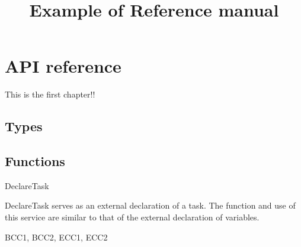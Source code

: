 \documentclass[12pt,a4paper,titlepage]{scrreprt}
\title{Example of Reference manual}
\begin{document}
\maketitle

\thispagestyle{plain}

\tableofcontents

\chapter{API reference}
\label{sec:api_reference}

This is the first chapter!! 

\section{Types}
\label{sec:types}

\section{Functions}
\label{sec:functions}


\begin{function}{DeclareTask}


  \begin{fundescription}
DeclareTask serves as an external declaration of a task. The function
and use of this service are similar to that of the external
declaration of variables.
  \end{fundescription}

  \begin{funparameters}
  \end{funparameters}

  \begin{funconformance}
    BCC1, BCC2, ECC1, ECC2
  \end{funconformance}
\end{function}



\end{document}
